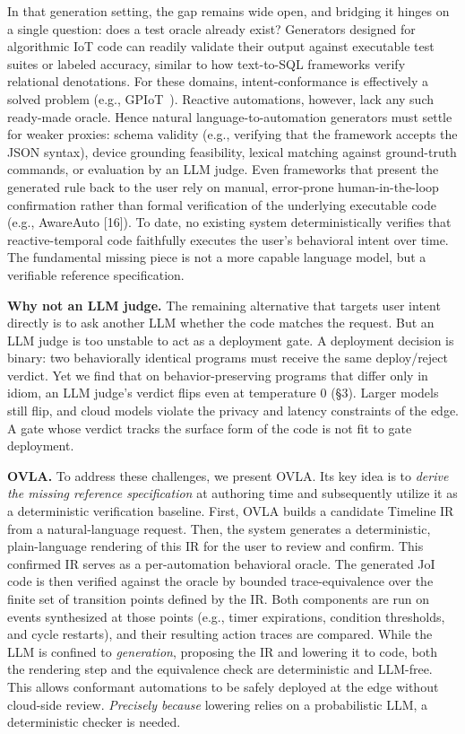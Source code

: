 \documentclass[sigconf,nonacm,anonymous,review]{acmart}
\begin{document}
In that generation setting, the gap remains wide open, and bridging it hinges on a single question:
does a test oracle already exist? Generators designed for algorithmic IoT code can readily validate their output against executable test suites or labeled accuracy, similar to how text-to-SQL frameworks verify relational denotations. For these domains, intent-conformance is effectively a solved problem (e.g., GPIoT~\cite{gpiot}). Reactive automations, however, lack any such ready-made oracle. Hence natural language-to-automation generators must settle for weaker proxies: schema validity (e.g., verifying that the framework accepts the JSON syntax), device grounding feasibility, lexical matching against ground-truth commands, or evaluation by an LLM judge. Even frameworks that present the generated rule back to the user rely on manual, error-prone human-in-the-loop confirmation rather than formal verification of the underlying executable code (e.g., AwareAuto [16]). To date, no existing system deterministically verifies that reactive-temporal code faithfully executes the user's behavioral intent over time. The fundamental missing piece is not a more capable language model, but a verifiable reference specification.

\textbf{Why not an LLM judge.} The remaining alternative that targets user intent directly is to ask another LLM whether the code matches the request. But an LLM judge is too unstable to act as a deployment gate. A deployment decision is binary: two behaviorally identical programs must receive the same deploy/reject verdict. Yet we find that on behavior-preserving programs that differ only in idiom, an LLM judge's verdict flips even at temperature 0 (\S3). Larger models still flip, and cloud models violate the privacy and latency constraints of the edge. A gate whose verdict tracks the surface form of the code is not fit to gate deployment.

\textbf{OVLA.} To address these challenges, we present OVLA. Its key idea is to \emph{derive the missing reference specification} at authoring time and subsequently utilize it as a deterministic verification baseline.
First, OVLA builds a candidate Timeline IR from a natural-language request. Then, the system generates a deterministic, plain-language rendering of this IR for the user to review and confirm.
This confirmed IR serves as a per-automation behavioral oracle. The generated JoI code is then verified against the oracle by bounded trace-equivalence over the finite set of transition points defined by the IR. Both components are run on events synthesized at those points (e.g., timer expirations, condition thresholds, and cycle restarts), and their resulting action traces are compared. While the LLM is confined to \emph{generation}, proposing the IR and lowering it to code, both the rendering step and the equivalence check are deterministic and LLM-free. This allows conformant automations to be safely deployed at the edge without cloud-side review. \emph{Precisely because} lowering relies on a probabilistic LLM,
a deterministic checker is needed.
\end{document}
